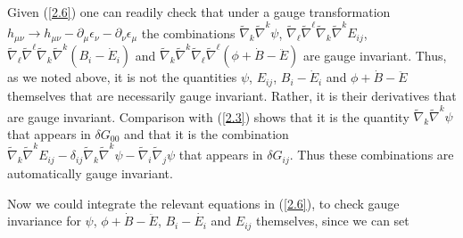 \documentclass[aps,onecolumn,10pt]{revtex4}
\numberwithin{equation}{section}
\numberwithin{equation}{section}
\begin{document}
Given (\ref{2.6}) one can readily check that under a gauge transformation $h_{\mu\nu}\rightarrow h_{\mu\nu}-\partial_{\mu}\epsilon_{\nu}-\partial_{\nu}\epsilon_{\mu}$ the combinations  $\tilde{\nabla}_k\tilde{\nabla}^k\psi $, $\tilde{\nabla}_{\ell}\tilde{\nabla}^{\ell}\tilde{\nabla}_k\tilde{\nabla}^kE_{ij}$, $\tilde{\nabla}_{\ell}\tilde{\nabla}^{\ell}\tilde{\nabla}_k\tilde{\nabla}^k(B_i-\dot{E}_i)$ and $ \tilde{\nabla}_k\tilde{\nabla}^k\tilde{\nabla}_{\ell}\tilde{\nabla}^{\ell}(\phi+\dot{B}-\ddot{E})$ are gauge invariant. Thus, as we noted above, it is not the quantities $\psi$, $E_{ij}$, $B_i-\dot{E}_i$ and $\phi+\dot{B}-\ddot{E}$ themselves that are necessarily gauge invariant. Rather, it is their derivatives that are  gauge invariant. Comparison with (\ref{2.3}) shows that it is the quantity $\tilde{\nabla}_k\tilde{\nabla}^k\psi$ that appears in $\delta G_{00}$ and that it is the combination $ \tilde{\nabla}_k\tilde{\nabla}^kE_{ij}-\delta_{ij}\tilde{\nabla}_k\tilde{\nabla}^k\psi-\tilde{\nabla}_i\tilde{\nabla}_j\psi$ that appears in  $\delta G_{ij}$. Thus these  combinations are automatically gauge invariant.


Now we could integrate the relevant equations in (\ref{2.6}), to check gauge invariance for $\psi$, $\phi+\dot{B}-\ddot{E}$, $B_{i}-\dot{E_i}$ and $E_{ij}$ themselves, since we can set
\end{document}
